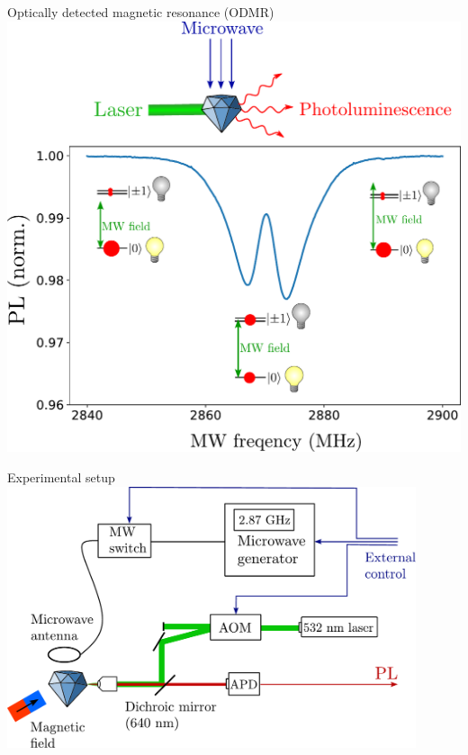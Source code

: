 \documentclass{beamer}
\begin{document}
\begin{frame}{Optically detected magnetic resonance (ODMR)}
\centering
\includegraphics[width=\textwidth,height=0.9\textheight,keepaspectratio]{Slide_ODMR_0}
\end{frame}

\begin{frame}{Experimental setup}
\centering
\includegraphics[width=0.9\textwidth,height=0.9\textheight,keepaspectratio]{Slide_setup}
\end{frame}
\end{document}

